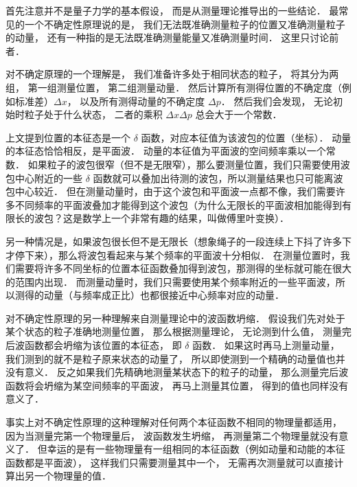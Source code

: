 首先注意并不是量子力学的基本假设， 而是从测量理论推导出的一些结论． 最常见的一个不确定性原理说的是， 我们无法既准确测量粒子的位置又准确测量粒子的动量， 还有一种指的是无法既准确测量能量又准确测量时间． 这里只讨论前者．

对不确定原理的一个理解是， 我们准备许多处于相同状态的粒子， 将其分为两组， 第一组测量位置， 第二组测量动量． 然后计算所有测得位置的不确定度（例如标准差）$\Delta x$， 以及所有测得动量的不确定度 $\Delta p$． 然后我们会发现， 无论初始时粒子处于什么状态， 二者的乘积 $\Delta x \Delta p$ 总会大于一个常数．

上文提到位置的本征态是一个 $\delta$ 函数，对应本征值为该波包的位置（坐标）． 动量的本征态恰恰相反，是平面波． 动量的本征值为平面波的空间频率乘以一个常数． 如果粒子的波包很窄（但不是无限窄），那么要测量位置，我们只需要使用波包中心附近的一些 $\delta$ 函数就可以叠加出待测的波包，所以测量结果也只可能离波包中心较近． 但在测量动量时，由于这个波包和平面波一点都不像，我们需要许多不同频率的平面波叠加才能得到这个波包（为什么无限长的平面波相加能得到有限长的波包？这是数学上一个非常有趣的结果，叫做傅里叶变换）．

另一种情况是，如果波包很长但不是无限长（想象绳子的一段连续上下抖了许多下才停下来），那么将波包看起来与某个频率的平面波十分相似． 在测量位置时，我们需要将许多不同坐标的位置本征函数叠加得到波包，那测得的坐标就可能在很大的范围内出现． 而测量动量时，我们只需要使用某个频率附近的一些平面波，所以测得的动量（与频率成正比）也都很接近中心频率对应的动量．

对不确定性原理的另一种理解来自测量理论中的波函数坍缩． 假设我们先对处于某个状态的粒子准确地测量位置， 那么根据测量理论， 无论测到什么值， 测量完后波函数都会坍缩为该位置的本征态， 即 $\delta$ 函数． 如果这时再马上测量动量， 我们测到的就不是粒子原来状态的动量了， 所以即使测到一个精确的动量值也并没有意义． 反之如果我们先精确地测量某状态下的粒子的动量， 那么测量完后波函数将会坍缩为某空间频率的平面波， 再马上测量其位置， 得到的值也同样没有意义了．

事实上对不确定性原理的这种理解对任何两个本征函数不相同的物理量都适用， 因为当测量完第一个物理量后， 波函数发生坍缩， 再测量第二个物理量就没有意义了． 但幸运的是有一些物理量有一组相同的本征函数（例如动量和动能的本征函数都是平面波）， 这样我们只需要测量其中一个， 无需再次测量就可以直接计算出另一个物理量的值．
